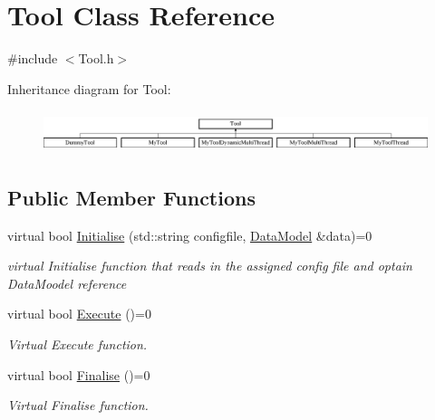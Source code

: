 \hypertarget{classTool}{\section{Tool Class Reference}
\label{classTool}
}


{\ttfamily \#include $<$Tool.\-h$>$}

Inheritance diagram for Tool\-:\begin{figure}[H]
\begin{center}
\leavevmode
\includegraphics[height=1.258427cm]{classTool}
\end{center}
\end{figure}
\subsection*{Public Member Functions}
\begin{DoxyCompactItemize}
\item 
virtual bool \hyperlink{classTool_a4b04a99172dfe09dc97927d1feaff0ce}{Initialise} (std\-::string configfile, \hyperlink{classDataModel}{Data\-Model} \&data)=0
\begin{DoxyCompactList}\small\item\em virtual Initialise function that reads in the assigned config file and optain Data\-Moodel reference \end{DoxyCompactList}\item 
\hypertarget{classTool_a6a71469fa4efffd6fb71afbd4941e49d}{virtual bool \hyperlink{classTool_a6a71469fa4efffd6fb71afbd4941e49d}{Execute} ()=0}\label{classTool_a6a71469fa4efffd6fb71afbd4941e49d}

\begin{DoxyCompactList}\small\item\em Virtual Execute function. \end{DoxyCompactList}\item 
\hypertarget{classTool_a1f9a82fe5cc9afd63fc8eb3aaf5d80ca}{virtual bool \hyperlink{classTool_a1f9a82fe5cc9afd63fc8eb3aaf5d80ca}{Finalise} ()=0}\label{classTool_a1f9a82fe5cc9afd63fc8eb3aaf5d80ca}

\begin{DoxyCompactList}\small\item\em Virtual Finalise function. \end{DoxyCompactList}\end{DoxyCompactItemize}
